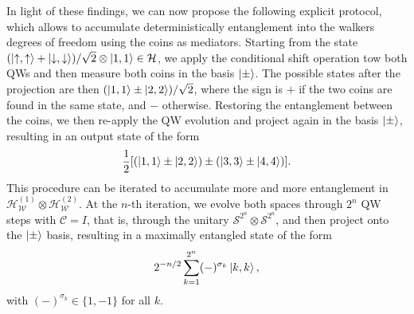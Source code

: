 \documentclass[
	aps, pra,
	superscriptaddress, twocolumn,
	floatfix,
	10pt
]{revtex4-1}
\newcommand{\on}[1]{\operatorname{#1}}
\newcommand{\parTitle}[1]{\noindent{\color{Mahogany}(\emph{#1})}}
\newcommand{\RR}{\mathbb{R}}
\newcommand{\calC}{{\mathcal{C}}}
\newcommand{\calH}{{\mathcal{H}}}
\newcommand{\calS}{{\mathcal{S}}}
\newcommand{\calW}{{\mathcal{W}}}
\newcommand{\HC}{\calH_\calC}
\newcommand{\HW}{\calH_\calW}
\renewcommand{\parTitle}[1]{}
\begin{document}
\parTitle{Specific optimal accumulation protocol}
In light of these findings, we can now propose the following explicit protocol, which allows to accumulate deterministically entanglement into the walkers degrees of freedom using the coins as mediators.
Starting from the state
$(\ket{\uparrow,\uparrow}+\ket{\downarrow,\downarrow})/\sqrt2\otimes\ket{1,1}\in\calH$,
we apply the conditional shift operation tow both QWs and then measure both coins in the basis $\ket\pm$. %
The possible states after the projection are then
   $(\ket{1,1} \pm \ket{2,2})/\sqrt2$,
where the sign is $+$ if the two coins are found in the same state, and $-$ otherwise.
Restoring the entanglement between the coins, we then re-apply the QW evolution and project again in the basis $\ket\pm$, resulting in an output state of the form
\begin{equation}
    \frac12[(\ket{1,1}\pm\ket{2,2}) \pm (\ket{3,3} \pm \ket{4,4})].
\end{equation}
This procedure can be iterated to accumulate more and more entanglement in $\HW^{(1)}\otimes\HW^{(2)}$.
At the $n$-th iteration, we evolve both spaces through $2^n$ QW steps with $\calC=I$, that is, through the unitary $\calS^{2^n}\otimes\calS^{2^n}$, and then project onto the $\ket\pm$ basis,
resulting in a maximally entangled state of the form
\begin{equation}
    2^{-n/2}\sum_{k=1}^{2^n} (-)^{\sigma_k}\ket{k,k},
\end{equation}
with $(-)^{\sigma_k}\in\{1,-1\}$ for all $k$.

\end{document}
